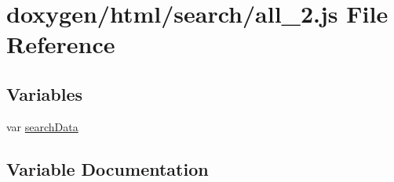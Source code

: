 \hypertarget{a00047}{}\section{doxygen/html/search/all\+\_\+2.js File Reference}
\label{a00047}
\subsection*{Variables}
\begin{DoxyCompactItemize}
\item 
var \hyperlink{a00047_ad01a7523f103d6242ef9b0451861231e}{search\+Data}
\end{DoxyCompactItemize}


\subsection{Variable Documentation}
\hypertarget{a00047_ad01a7523f103d6242ef9b0451861231e}{}
